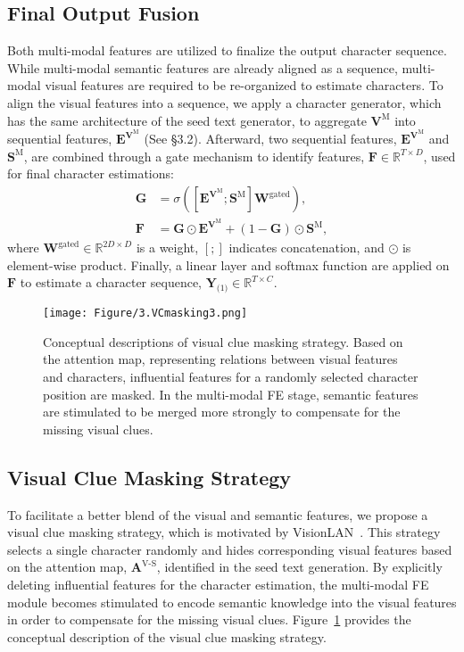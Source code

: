 \documentclass[runningheads]{llncs}
\begin{document}
\subsection{Final Output Fusion}

Both multi-modal features are utilized to finalize the output character sequence. While multi-modal semantic features are already aligned as a sequence, multi-modal visual features are required to be re-organized to estimate characters. To align the visual features into a sequence, we apply a character generator, which has the same architecture of the seed text generator, to aggregate $\mathbf{V}^{\text{M}}$ into sequential features, $\mathbf{E}^{\mathbf{V}^{\text{M}}}$ (See \S3.2). Afterward, two sequential features, $\mathbf{E}^{\mathbf{V}^{\text{M}}}$ and $\mathbf{S}^\text{M}$, are combined through a gate mechanism to identify features, $\mathbf{F}\in\mathbb{R}^{T \times D}$, used for final character estimations:
\begin{align}
   \mathbf{G} & = \sigma \left ( \left [ \mathbf{E}^{\mathbf{V}^{\text{M}}}; \mathbf{S}^\text{M} \right ] \mathbf{W}^\text{gated} \right ), \\
   \mathbf{F} & = \mathbf{G} \odot \mathbf{E}^{\mathbf{V}^{\text{M}}} + (1-\mathbf{G}) \odot \mathbf{S}^\text{M},
\end{align}
where $\mathbf{W}^\text{gated} \in \mathbb{R}^{2D \times D}$ is a weight, $\left[;\right]$ indicates concatenation, and $\odot$ is element-wise product. Finally, a linear layer and softmax function are applied on $\mathbf{F}$ to estimate a character sequence, $\mathbf{Y}_\text{(1)}\in\mathbb{R}^{T \times C}$. 


\begin{figure}[t]
    \centering
    \texttt{[image: Figure/3.VCmasking3.png]}
    \caption{Conceptual descriptions of visual clue masking strategy. Based on the attention map, representing relations between visual features and characters, influential features for a randomly selected character position are masked. In the multi-modal FE stage, semantic features are stimulated to be merged more strongly to compensate for the missing visual clues.}
    \label{fig:Masking}
\end{figure}

\subsection{Visual Clue Masking Strategy}

To facilitate a better blend of the visual and semantic features, we propose a visual clue masking strategy, which is motivated by VisionLAN~\cite{VisionLAN}. This strategy selects a single character randomly and hides corresponding visual features based on the attention map, $\mathbf{A}^\text{V-S}$, identified in the seed text generation.
By explicitly deleting influential features for the character estimation, the multi-modal FE module becomes stimulated to encode semantic knowledge into the visual features in order to compensate for the missing visual clues. Figure~\ref{fig:Masking} provides the conceptual description of the visual clue masking strategy.
\end{document}
